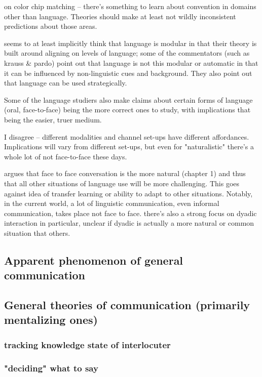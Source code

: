 \documentclass[]{article}
\begin{document}
\cite{murthy2022} on color chip matching -- there's something to learn about convention in domains other than language. Theories should make at least not wildly inconsistent predictions about those areas. 

\cite{pickering2004} seems to at least implicitly think that language is modular in that their theory is built around aligning on levels of language; some of the commentators (such as krauss \& pardo) point out that language is not this modular or automatic in that it can be influenced by non-linguistic cues and background. They also point out that language can be used strategically. 

Some of the language studiers also make claims about certain forms of language (oral, face-to-face) being the more correct ones to study, with implications that being the easier, truer medium. 

I disagree -- different modalities and channel set-ups have different affordances. Implications will vary from different set-ups, but even for "naturalistic" there's a whole lot of not face-to-face these days. 

\cite{clark1996} argues that face to face conversation is the more natural (chapter 1) and thus that all other situations of language use will be more challenging. This goes against idea of transfer learning or ability to adapt to other situations. Notably, in the current world, a lot of linguistic communication, even informal communication, takes place not face to face. there's also a strong focus on dyadic interaction in particular, unclear if dyadic is actually a more natural or common situation that others.

\subsection{Apparent phenomenon of general communication}

\subsection{General theories of communication (primarily mentalizing ones)}

\subsubsection{tracking knowledge state of interlocuter}
\subsubsection{"deciding" what to say}
\end{document}
